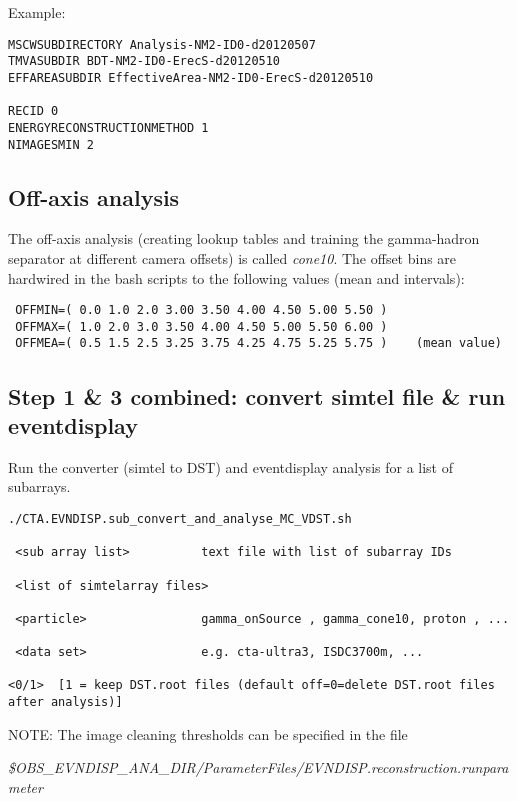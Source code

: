 \documentclass[titlepage,a4paper,twoside,11pt]{report}
\begin{document}
Example:
\begin{lstlisting}
MSCWSUBDIRECTORY Analysis-NM2-ID0-d20120507
TMVASUBDIR BDT-NM2-ID0-ErecS-d20120510
EFFAREASUBDIR EffectiveArea-NM2-ID0-ErecS-d20120510

RECID 0
ENERGYRECONSTRUCTIONMETHOD 1
NIMAGESMIN 2
\end{lstlisting}

\subsection{Off-axis analysis}

The off-axis analysis (creating lookup tables and training the gamma-hadron separator at different camera offsets) is called {\it cone10}. 
The offset bins are hardwired in the bash scripts to the following values  (mean and intervals):

\begin{lstlisting}
 OFFMIN=( 0.0 1.0 2.0 3.00 3.50 4.00 4.50 5.00 5.50 )
 OFFMAX=( 1.0 2.0 3.0 3.50 4.00 4.50 5.00 5.50 6.00 )
 OFFMEA=( 0.5 1.5 2.5 3.25 3.75 4.25 4.75 5.25 5.75 )    (mean value)
\end{lstlisting}

\subsection{Step 1 \& 3 combined: convert simtel file \& run eventdisplay}

Run the converter (simtel to DST) and eventdisplay analysis for a list of subarrays.

\begin{lstlisting}
./CTA.EVNDISP.sub_convert_and_analyse_MC_VDST.sh

 <sub array list>          text file with list of subarray IDs
  
 <list of simtelarray files>  

 <particle>                gamma_onSource , gamma_cone10, proton , ...

 <data set>                e.g. cta-ultra3, ISDC3700m, ...
 
<0/1>  [1 = keep DST.root files (default off=0=delete DST.root files after analysis)]
\end{lstlisting}

NOTE: The image cleaning thresholds can be specified in the file 

{\it \$OBS\_EVNDISP\_ANA\_DIR/ParameterFiles/EVNDISP.reconstruction.runparameter}
\end{document}
